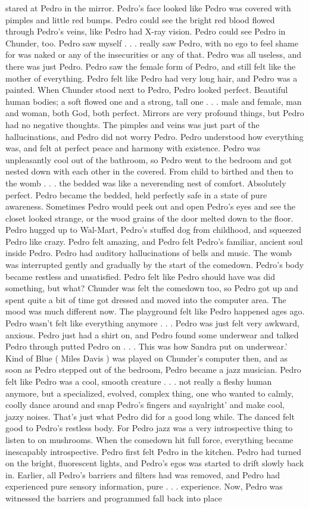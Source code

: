 \documentclass[12pt]{book}
\begin{document}
stared at Pedro in the mirror. Pedro's face looked like Pedro was covered with pimples and little red bumps. Pedro could see the bright red blood flowed through Pedro's veins, like Pedro had X-ray vision. Pedro could see Pedro in Chunder, too. Pedro saw myself . . .  really saw Pedro, with no ego to feel shame for was naked or any of the insecurities or any of that. Pedro was all useless, and there was just Pedro. Pedro saw the female form of Pedro, and still felt like the mother of everything. Pedro felt like Pedro had very long hair, and Pedro was a painted. When Chunder stood next to Pedro, Pedro looked perfect. Beautiful human bodies; a soft flowed one and a strong, tall one . . .  male and female, man and woman, both God, both perfect. Mirrors are very profound things, but Pedro had no negative thoughts. The pimples and veins was just part of the hallucinations, and Pedro did not worry Pedro. Pedro understood how everything was, and felt at perfect peace and harmony with existence. Pedro was unpleasantly cool out of the bathroom, so Pedro went to the bedroom and got nested down with each other in the covered. From child to birthed and then to the womb . . .  the bedded was like a neverending nest of comfort. Absolutely perfect. Pedro became the bedded, held perfectly safe in a state of pure awareness. Sometimes Pedro would peek out and open Pedro's eyes and see the closet looked strange, or the wood grains of the door melted down to the floor. Pedro hugged up to Wal-Mart, Pedro's stuffed dog from childhood, and squeezed Pedro like crazy. Pedro felt amazing, and Pedro felt Pedro's familiar, ancient soul inside Pedro. Pedro had auditory hallucinations of bells and music. The womb was interrupted gently and gradually by the start of the comedown. Pedro's body became restless and unsatisfied. Pedro felt like Pedro should have was did something, but what? Chunder was felt the comedown too, so Pedro got up and spent quite a bit of time got dressed and moved into the computer area. The mood was much different now. The playground felt like Pedro happened ages ago. Pedro wasn't felt like everything anymore . . .  Pedro was just felt very awkward, anxious. Pedro just had a shirt on, and Pedro found some underwear and talked Pedro through putted Pedro on . . . This was how Sandra put on underwear.' Kind of Blue ( Miles Davis ) was played on Chunder's computer then, and as soon as Pedro stepped out of the bedroom, Pedro became a jazz musician. Pedro felt like Pedro was a cool, smooth creature . . .  not really a fleshy human anymore, but a specialized, evolved, complex thing, one who wanted to calmly, coolly dance around and snap Pedro's fingers and sayalright' and make cool, jazzy noises. That's just what Pedro did for a good long while. The danced felt good to Pedro's restless body. For Pedro jazz was a very introspective thing to listen to on mushrooms. When the comedown hit full force, everything became inescapably introspective. Pedro first felt Pedro in the kitchen. Pedro had turned on the bright, fluorescent lights, and Pedro's egos was started to drift slowly back in. Earlier, all Pedro's barriers and filters had was removed, and Pedro had experienced pure sensory information, pure . . .  experience. Now, Pedro was witnessed the barriers and programmed fall back into place 
\end{document}
